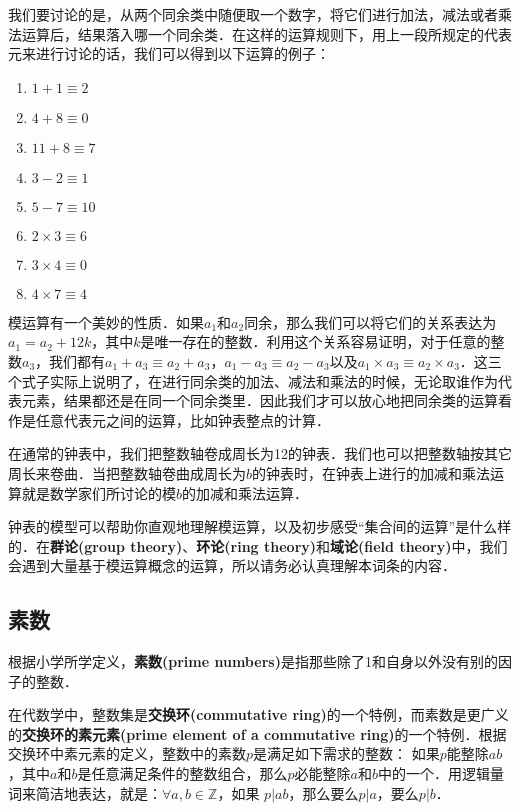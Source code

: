 我们要讨论的是，从两个同余类中随便取一个数字，将它们进行加法，减法或者乘法运算后，结果落入哪一个同余类．在这样的运算规则下，用上一段所规定的代表元来进行讨论的话，我们可以得到以下运算的例子：
\begin{enumerate}


\item $1+1\equiv 2$
\item $4+8\equiv 0$
\item $11+8\equiv 7$
\item $3-2\equiv 1$
\item $5-7\equiv 10$
\item $2\times 3\equiv 6$
\item $3\times 4\equiv 0$
\item $4\times 7\equiv 4$


\end{enumerate}

模运算有一个美妙的性质．如果$a_1$和$a_2$同余，那么我们可以将它们的关系表达为$a_1=a_2+12k$，其中$k$是唯一存在的整数．利用这个关系容易证明，对于任意的整数$a_3$，我们都有$a_1+a_3\equiv a_2+a_3$，$a_1-a_3\equiv a_2-a_3$以及$a_1\times a_3\equiv a_2\times a_3$．这三个式子实际上说明了，在进行同余类的加法、减法和乘法的时候，无论取谁作为代表元素，结果都还是在同一个同余类里．因此我们才可以放心地把同余类的运算看作是任意代表元之间的运算，比如钟表整点的计算．

在通常的钟表中，我们把整数轴卷成周长为12的钟表．我们也可以把整数轴按其它周长来卷曲．当把整数轴卷曲成周长为$b$的钟表时，在钟表上进行的加减和乘法运算就是数学家们所讨论的模$b$的加减和乘法运算．

钟表的模型可以帮助你直观地理解模运算，以及初步感受“集合间的运算”是什么样的．在\textbf{群论(group theory)}、\textbf{环论(ring theory)}和\textbf{域论(field theory)}中，我们会遇到大量基于模运算概念的运算，所以请务必认真理解本词条的内容．

\subsection{素数}

根据小学所学定义，\textbf{素数(prime numbers)}是指那些除了1和自身以外没有别的因子的整数．

在代数学中，整数集是\textbf{交换环(commutative ring)}的一个特例，而素数是更广义的\textbf{交换环的素元素(prime element of a commutative ring)}的一个特例．根据交换环中素元素的定义，整数中的素数$p$是满足如下需求的整数：
如果$p$能整除$ab$，其中$a$和$b$是任意满足条件的整数组合，那么$p$必能整除$a$和$b$中的一个．用逻辑量词来简洁地表达，就是：$\forall a, b\in \mathbb{Z}$，如果 $p|ab$，那么要么$p|a$，要么$p|b$． 